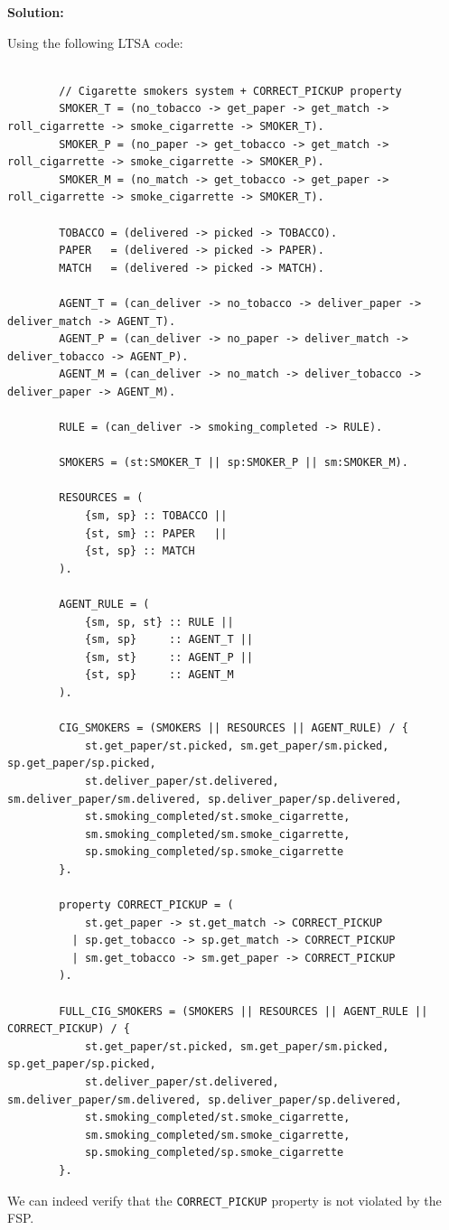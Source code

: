 \documentclass{article}
\newenvironment{solution}{
	\vspace{0.4cm}\par\noindent\large\textbf{{Solution:}}\par\vspace{1em}
}{\vspace{0.1em}}
\begin{document}
\begin{solution}
	Using the following LTSA code:

	\begin{lstlisting}

		// Cigarette smokers system + CORRECT_PICKUP property
		SMOKER_T = (no_tobacco -> get_paper -> get_match -> roll_cigarrette -> smoke_cigarrette -> SMOKER_T).
		SMOKER_P = (no_paper -> get_tobacco -> get_match -> roll_cigarrette -> smoke_cigarrette -> SMOKER_P).
		SMOKER_M = (no_match -> get_tobacco -> get_paper -> roll_cigarrette -> smoke_cigarrette -> SMOKER_T).
		
		TOBACCO = (delivered -> picked -> TOBACCO).
		PAPER   = (delivered -> picked -> PAPER).
		MATCH   = (delivered -> picked -> MATCH).
		
		AGENT_T = (can_deliver -> no_tobacco -> deliver_paper -> deliver_match -> AGENT_T).
		AGENT_P = (can_deliver -> no_paper -> deliver_match -> deliver_tobacco -> AGENT_P).
		AGENT_M = (can_deliver -> no_match -> deliver_tobacco -> deliver_paper -> AGENT_M).
		
		RULE = (can_deliver -> smoking_completed -> RULE).
		
		SMOKERS = (st:SMOKER_T || sp:SMOKER_P || sm:SMOKER_M).
		
		RESOURCES = (
		    {sm, sp} :: TOBACCO ||
		    {st, sm} :: PAPER   ||
		    {st, sp} :: MATCH
		).
		
		AGENT_RULE = (
		    {sm, sp, st} :: RULE ||
		    {sm, sp}     :: AGENT_T ||
		    {sm, st}     :: AGENT_P ||
		    {st, sp}     :: AGENT_M
		).
		
		CIG_SMOKERS = (SMOKERS || RESOURCES || AGENT_RULE) / {
		    st.get_paper/st.picked, sm.get_paper/sm.picked, sp.get_paper/sp.picked,
		    st.deliver_paper/st.delivered, sm.deliver_paper/sm.delivered, sp.deliver_paper/sp.delivered,
		    st.smoking_completed/st.smoke_cigarrette,
		    sm.smoking_completed/sm.smoke_cigarrette,
		    sp.smoking_completed/sp.smoke_cigarrette
		}.
		
		property CORRECT_PICKUP = (
		    st.get_paper -> st.get_match -> CORRECT_PICKUP
		  | sp.get_tobacco -> sp.get_match -> CORRECT_PICKUP
		  | sm.get_tobacco -> sm.get_paper -> CORRECT_PICKUP
		).
		
		FULL_CIG_SMOKERS = (SMOKERS || RESOURCES || AGENT_RULE || CORRECT_PICKUP) / {
		    st.get_paper/st.picked, sm.get_paper/sm.picked, sp.get_paper/sp.picked,
		    st.deliver_paper/st.delivered, sm.deliver_paper/sm.delivered, sp.deliver_paper/sp.delivered,
		    st.smoking_completed/st.smoke_cigarrette,
		    sm.smoking_completed/sm.smoke_cigarrette,
		    sp.smoking_completed/sp.smoke_cigarrette
		}.
		\end{lstlisting}

	We can indeed verify that the \texttt{CORRECT\_PICKUP} property is not violated by the FSP.

\end{solution}
\end{document}
